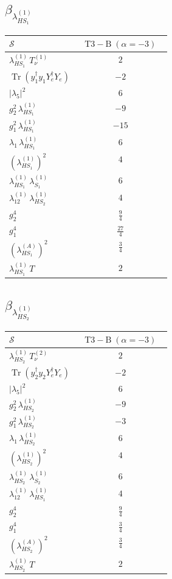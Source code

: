 \documentclass[9pt]{article}
\begin{document}
\subsection*{$ \beta_{\lambda_{HS_1}^{(1)}} $}
\begin{longtable}{@{}p{0.31\linewidth}c@{}}
\toprule
$\mathcal{S}$ & $ \mathrm{T3-B}\;(\alpha=-3) $ \\
\midrule
$ \lambda_{HS_1}^{(1)}\,T_{\nu}^{(1)} $ & $ 2 $ \\
$ \operatorname{Tr}(y_1^\dagger y_1Y_e^\dagger Y_e) $ & $ -2 $ \\
$ |\lambda_5|^2 $ & $ 6 $ \\
$ g_2^2\,\lambda_{HS_1}^{(1)} $ & $ -9 $ \\
$ g_1^2\,\lambda_{HS_1}^{(1)} $ & $ -15 $ \\
$ \lambda_1\,\lambda_{HS_1}^{(1)} $ & $ 6 $ \\
$ \left(\lambda_{HS_1}^{(1)}\right)^2 $ & $ 4 $ \\
$ \lambda_{HS_1}^{(1)}\,\lambda_{S_1}^{(1)} $ & $ 6 $ \\
$ \lambda_{12}^{(1)}\,\lambda_{HS_2}^{(1)} $ & $ 4 $ \\
$ g_2^4 $ & $ \frac{9}{4} $ \\
$ g_1^4 $ & $ \frac{27}{4} $ \\
$ \left(\lambda_{HS_1}^{(A)}\right)^2 $ & $ \frac{3}{4} $ \\
$ \lambda_{HS_1}^{(1)}\,T $ & $ 2 $ \\
\bottomrule
\end{longtable}
\subsection*{$ \beta_{\lambda_{HS_2}^{(1)}} $}
\begin{longtable}{@{}p{0.31\linewidth}c@{}}
\toprule
$\mathcal{S}$ & $ \mathrm{T3-B}\;(\alpha=-3) $ \\
\midrule
$ \lambda_{HS_2}^{(1)}\,T_{\nu}^{(2)} $ & $ 2 $ \\
$ \operatorname{Tr}(y_2^\dagger y_2Y_e^\dagger Y_e) $ & $ -2 $ \\
$ |\lambda_5|^2 $ & $ 6 $ \\
$ g_2^2\,\lambda_{HS_2}^{(1)} $ & $ -9 $ \\
$ g_1^2\,\lambda_{HS_2}^{(1)} $ & $ -3 $ \\
$ \lambda_1\,\lambda_{HS_2}^{(1)} $ & $ 6 $ \\
$ \left(\lambda_{HS_2}^{(1)}\right)^2 $ & $ 4 $ \\
$ \lambda_{HS_2}^{(1)}\,\lambda_{S_2}^{(1)} $ & $ 6 $ \\
$ \lambda_{12}^{(1)}\,\lambda_{HS_1}^{(1)} $ & $ 4 $ \\
$ g_2^4 $ & $ \frac{9}{4} $ \\
$ g_1^4 $ & $ \frac{3}{4} $ \\
$ \left(\lambda_{HS_2}^{(A)}\right)^2 $ & $ \frac{3}{4} $ \\
$ \lambda_{HS_2}^{(1)}\,T $ & $ 2 $ \\
\bottomrule
\end{longtable}
\end{document}
